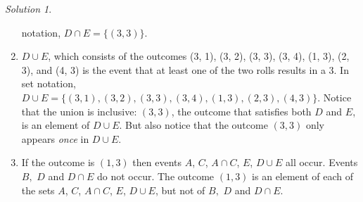 \documentclass[
  letterpaper,
  DIV=11,
  numbers=noendperiod]{scrreprt}
\theoremstyle{plain}
\theoremstyle{definition}
\theoremstyle{definition}
\theoremstyle{definition}
\theoremstyle{remark}
\newtheorem{refsolution}{Solution}[chapter]
\begin{document}
\begin{tcolorbox}
\begin{refsolution}
\begin{enumerate}
  notation, \(D\cap E = \{(3, 3)\}\).
\item
  \(D \cup E\), which consists of the outcomes (3, 1), (3, 2), (3, 3),
  (3, 4), (1, 3), (2, 3), and (4, 3) is the event that at least one of
  the two rolls results in a 3. In set notation,
  \(D \cup E = \{(3, 1), (3, 2), (3, 3), (3, 4), (1, 3), (2, 3), (4, 3)\}\).
  Notice that the union is inclusive: \((3, 3)\), the outcome that
  satisfies both \(D\) and \(E\), is an element of \(D\cup E\). But also
  notice that the outcome \((3, 3)\) only appears \emph{once} in
  \(D\cup E\).
\item
  If the outcome is \((1, 3)\) then events \(A\), \(C\), \(A\cap C\),
  \(E\), \(D\cup E\) all occur. Events \(B,\) \(D\) and \(D\cap E\) do
  not occur. The outcome \((1, 3)\) is an element of each of the sets
  \(A\), \(C\), \(A\cap C\), \(E\), \(D\cup E\), but not of \(B,\) \(D\)
  and \(D\cap E\).
\end{enumerate}

\label{sol-dice-event}

\end{refsolution}

\end{tcolorbox}
\end{document}
